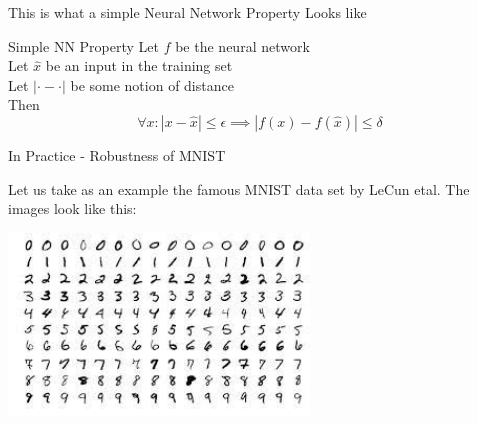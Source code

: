 \documentclass[t,compress,aspectratio=169]{beamer}
\begin{document}
\begin{frame}{This is what a simple Neural Network Property Looks like}

\Large
\begin{block}{Simple NN Property}
Let $f$ be the neural network\\
Let $\hat{x}$ be an input in the training set \\
Let \texttt{$|\cdot - \cdot |$} be some notion of distance\\

Then \[\forall x : | x - \hat{x}| \leq \epsilon \implies | f(x) - f(\hat{x})| \leq \delta\]

\end{block}


\end{frame}

\begin{frame}{In Practice - Robustness of MNIST}
    
    Let us take as an example the famous MNIST data set by LeCun etal. The images look like this:
    
    \centering
    \includegraphics[width=0.6\textwidth]{img/MNIST.jpeg}


\end{frame}

\end{document}
